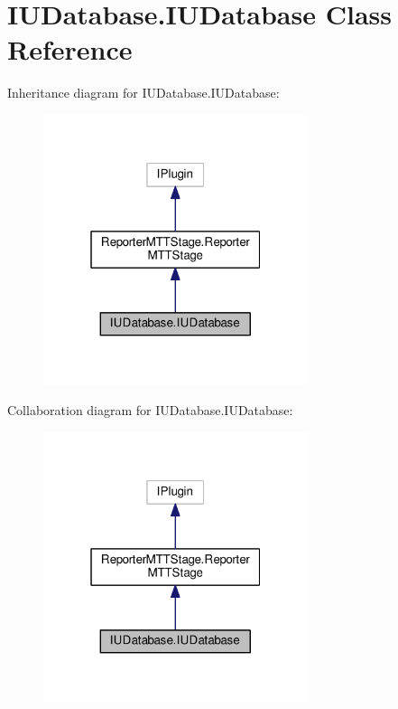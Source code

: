 \hypertarget{classIUDatabase_1_1IUDatabase}{\section{I\-U\-Database.\-I\-U\-Database Class Reference}
\label{classIUDatabase_1_1IUDatabase}
}


Inheritance diagram for I\-U\-Database.\-I\-U\-Database\-:
\nopagebreak
\begin{figure}[H]
\begin{center}
\leavevmode
\includegraphics[width=220pt]{classIUDatabase_1_1IUDatabase__inherit__graph}
\end{center}
\end{figure}


Collaboration diagram for I\-U\-Database.\-I\-U\-Database\-:
\nopagebreak
\begin{figure}[H]
\begin{center}
\leavevmode
\includegraphics[width=220pt]{classIUDatabase_1_1IUDatabase__coll__graph}
\end{center}
\end{figure}
